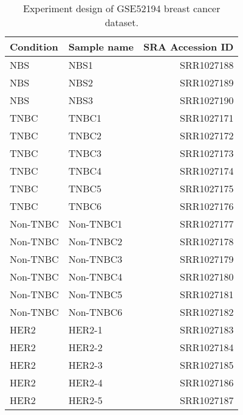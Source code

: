 \begin{table}[!htbp]
    \caption[Experiment design of GSE52194 breast cancer dataset]{
        Experiment design of GSE52194 breast cancer dataset.
    }
    \label{tab:dataset-breast}
    \centering
    \begin{threeparttable}
        \begin{tabular}{llr}
            \toprule
            Condition & Sample name & SRA Accession ID \\
            \midrule
            NBS      & NBS1      & SRR1027188 \\
            NBS      & NBS2      & SRR1027189 \\
            NBS      & NBS3      & SRR1027190 \\
            TNBC     & TNBC1     & SRR1027171 \\
            TNBC     & TNBC2     & SRR1027172 \\
            TNBC     & TNBC3     & SRR1027173 \\
            TNBC     & TNBC4     & SRR1027174 \\
            TNBC     & TNBC5     & SRR1027175 \\
            TNBC     & TNBC6     & SRR1027176 \\
            Non-TNBC & Non-TNBC1 & SRR1027177 \\
            Non-TNBC & Non-TNBC2 & SRR1027178 \\
            Non-TNBC & Non-TNBC3 & SRR1027179 \\
            Non-TNBC & Non-TNBC4 & SRR1027180 \\
            Non-TNBC & Non-TNBC5 & SRR1027181 \\
            Non-TNBC & Non-TNBC6 & SRR1027182 \\
            HER2     & HER2-1    & SRR1027183 \\
            HER2     & HER2-2    & SRR1027184 \\
            HER2     & HER2-3    & SRR1027185 \\
            HER2     & HER2-4    & SRR1027186 \\
            HER2     & HER2-5    & SRR1027187 \\
            \bottomrule
        \end{tabular}
    \end{threeparttable}
\end{table}
